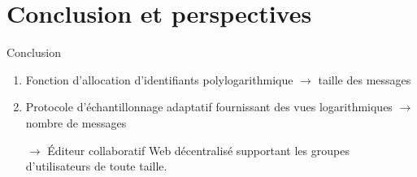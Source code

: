 \section{Conclusion et perspectives}

  



\begin{frame}{Conclusion}

  \begin{enumerate}
  \item Fonction d'allocation d'identifiants polylogarithmique $\rightarrow$
    taille des messages
    \vspace{0.2cm}
  \item Protocole d'échantillonnage adaptatif fournissant des vues
    logarithmiques $\rightarrow$ nombre de messages
  \end{enumerate}

  \vspace{0.5cm}
  \begin{itemize}
  \item [$\rightarrow$] Éditeur collaboratif Web décentralisé supportant les
    groupes d'utilisateurs de toute taille.
  \end{itemize}

\end{frame}



%       
    

